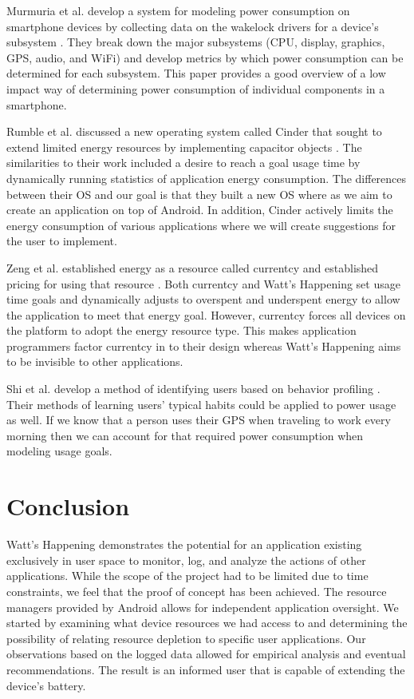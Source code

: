 \documentclass[11pt,twocolumn]{article}
\begin{document}
Murmuria et al. develop a system for modeling power consumption on smartphone devices by collecting data on the wakelock drivers for a device's subsystem \cite{mobilePowerUsageMeasurements}. 
They break down the major subsystems (CPU, display, graphics, GPS, audio, and WiFi) and develop metrics by which power consumption can be determined for each subsystem. 
This paper provides a good overview of a low impact way of determining power consumption of individual components in a smartphone. 

Rumble et al. discussed a new operating system called Cinder that sought to extend limited energy resources by implementing capacitor objects \cite{Rumble:2009:AJT:1592606.1592618}. 
The similarities to their work included a desire to reach a goal usage time by dynamically running statistics of application energy consumption. 
The differences between their OS and our goal is that they built a new OS where as we aim to create an application on top of Android. 
In addition, Cinder actively limits the energy consumption of various applications where we will create suggestions for the user to implement. 

Zeng et al. established energy as a resource called currentcy and established pricing for using that resource \cite{Zeng:2003:CUA:1247340.1247344}. 
Both currentcy and Watt's Happening set usage time goals and dynamically adjusts to overspent and underspent energy to allow the application to meet that energy goal. 
However, currentcy forces all devices on the platform to adopt the energy resource type. 
This makes application programmers factor currentcy in to their design whereas Watt's Happening aims to be invisible to other applications. 

Shi et al. develop a method of identifying users based on behavior profiling \cite{learningUserBehavior}. 
Their methods of learning users' typical habits could be applied to power usage as well. 
If we know that a person uses their GPS when traveling to work every morning then we can account for that required power consumption when modeling usage goals. 


\section*{Conclusion}
Watt's Happening demonstrates the potential for an application existing exclusively in user space to monitor, log, and analyze the actions of other applications.  
While the scope of the project had to be limited due to time constraints, we feel that the proof of concept has been achieved.  
The resource managers provided by Android allows for independent application oversight.
We started by examining what device resources we had access to and determining the possibility of 
relating resource depletion to specific user applications.  
Our observations based on the logged data allowed for empirical analysis and eventual recommendations.  
The result is an informed user that is capable of extending the device's battery.
{\footnotesize 
}
\end{document}
